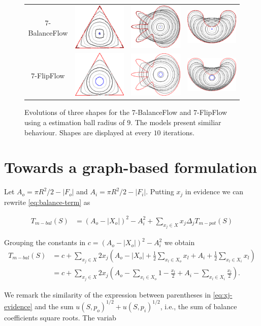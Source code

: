\begin{figure}
\begin{tabular}{cccc}
$7$-BalanceFlow & \includegraphics[scale=0.25]{figures/chapter7/balance-flow/triangle/summary.pdf} & \includegraphics[scale=0.25]{figures/chapter7/balance-flow/flower/summary.pdf} & \includegraphics[scale=0.25]{figures/chapter7/balance-flow/bean/summary.pdf} \\
$7$-FlipFlow & \includegraphics[scale=0.25]{figures/chapter7/flip-flow/triangle/summary.pdf} & \includegraphics[scale=0.25]{figures/chapter7/flip-flow/flower/summary.pdf} & \includegraphics[scale=0.25]{figures/chapter7/flip-flow/bean/summary.pdf} \\
\end{tabular}
\caption{Evolutions of three shapes for the $7$-BalanceFlow and $7$-FlipFlow using a estimation ball radius of $9$. The models present similiar behaviour. Shapes are displayed at every $10$ iterations.}
\label{fig:balance-flow-flip-flow-comparison}
\end{figure}

\section{Towards a graph-based formulation}

Let $A_o = \pi R^2 / 2 - |F_o|$ and $A_i = \pi R^2/2 - |F_i|$. Putting $x_j$ in evidence we can rewrite \eqref{eq:balance-term} as

\begin{align*}
	T_{m-bal}(S) &= (A_o - |X_o|)^2 - A_i^2 + \sum_{x_j \in X}{x_j\Delta_j T_{m-pot}(S)}
\end{align*} 

Grouping the constants in $c=(A_o - |X_o|)^2 - A_i^2$ we obtain
\begin{align}
	T_{m-bal}(S) &= c +\sum_{x_j \in X}{ 2x_j( A_o - |X_o| + \frac{1}{2}\sum_{x_l \in X_o}{x_l} + A_i + \frac{1}{2}\sum_{x_l \in X_i}{x_l})} \nonumber \\
	&= c +\sum_{x_j \in X}{2x_j( A_o - \sum_{x_l \in X_o}{1-\frac{x_l}{2}} + A_i - \sum_{x_l \in X_i}{\frac{x_l}{2}})}.
	\label{eq:xj-evidence}
\end{align}

We remark the similarity of the expression between parentheses in \eqref{eq:xj-evidence} and the sum $u(S,p_o)^{1/2} + u(S,p_i)^{1/2}$, i.e., the sum of balance coefficients square roots. The variab